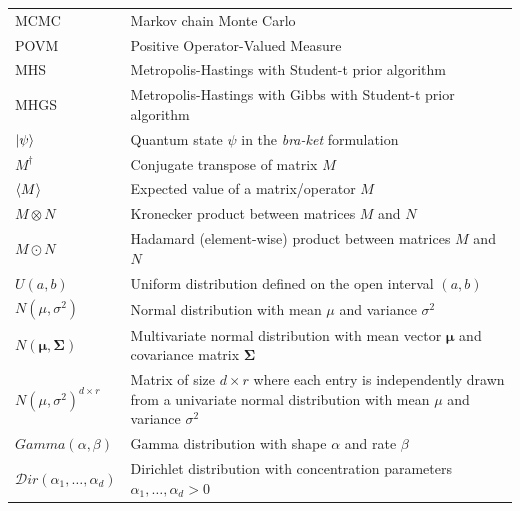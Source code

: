 \documentclass[12pt]{memoir}
\newcommand{\ti}{\textit}
\begin{document}
\begin{tabular}{p{0.2\linewidth} | p{0.8\linewidth}}

{MCMC} & Markov chain Monte Carlo\\

{POVM} & Positive Operator-Valued Measure\\

{MHS}  & Metropolis-Hastings with Student-t prior algorithm \\

{MHGS}  & Metropolis-Hastings with Gibbs with Student-t prior algorithm\\

$\ket{{\psi}}$ & Quantum state $\psi$ in the \ti{bra-ket} formulation\\

${M^\dagger}$ & Conjugate transpose of matrix $M$\\

$\braket{M}$ & Expected value of a matrix/operator $M$\\

${M\otimes N}$ & Kronecker product between matrices $M$ and $N$\\

${M \odot N}$ & Hadamard (element-wise) product between matrices $M$ and $N$\\

${U}(a,b)$ & Uniform distribution defined on the open interval $(a,b)$\\

$N(\mu, \sigma^2)$ & Normal distribution with mean $\mu$ and variance $\sigma^2$\\

$N(\boldsymbol{\mu},\boldsymbol{\Sigma})$ & Multivariate normal distribution with mean vector $\boldsymbol{\mu}$ and covariance matrix $\boldsymbol{\Sigma}$\\

$N(\mu, \sigma^2)^{d \times r}$& Matrix of size $d\times r $ where each entry is independently drawn from a univariate normal distribution with mean $\mu$ and variance $\sigma^2$ \\

$Gamma(\alpha,\beta)$ & Gamma distribution with shape $\alpha$ and rate $\beta$\\

$\mathcal{D}ir(\alpha_1,\dots,\alpha_d)$ & Dirichlet distribution with concentration parameters $\alpha_1,\dots,\alpha_d > 0$

\end{tabular}
\end{document}
